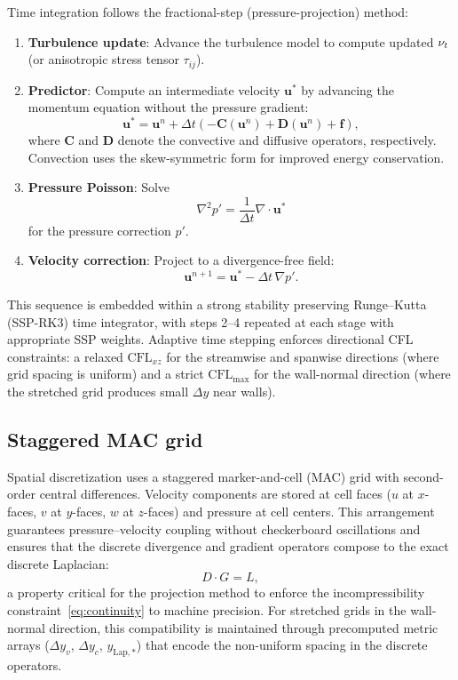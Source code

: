 Time integration follows the fractional-step (pressure-projection) method:
\begin{enumerate}
    \item \textbf{Turbulence update}: Advance the turbulence model to compute updated $\nu_t$ (or anisotropic stress tensor $\tau_{ij}$).
    \item \textbf{Predictor}: Compute an intermediate velocity $\bm{u}^*$ by advancing the momentum equation without the pressure gradient:
    \begin{equation}
        \bm{u}^* = \bm{u}^n + \Delta t \left( -\bm{C}(\bm{u}^n) + \bm{D}(\bm{u}^n) + \bm{f} \right),
    \end{equation}
    where $\bm{C}$ and $\bm{D}$ denote the convective and diffusive operators, respectively.
    Convection uses the skew-symmetric form for improved energy conservation.
    \item \textbf{Pressure Poisson}: Solve
    \begin{equation}
        \nabla^2 p' = \frac{1}{\Delta t} \nabla \cdot \bm{u}^*
    \end{equation}
    for the pressure correction $p'$.
    \item \textbf{Velocity correction}: Project to a divergence-free field:
    \begin{equation}
        \bm{u}^{n+1} = \bm{u}^* - \Delta t \, \nabla p'.
    \end{equation}
\end{enumerate}
This sequence is embedded within a strong stability preserving Runge--Kutta (SSP-RK3) time integrator, with steps 2--4 repeated at each stage with appropriate SSP weights.
Adaptive time stepping enforces directional CFL constraints: a relaxed $\mathrm{CFL}_{xz}$ for the streamwise and spanwise directions (where grid spacing is uniform) and a strict $\mathrm{CFL}_{\max}$ for the wall-normal direction (where the stretched grid produces small $\Delta y$ near walls).

\subsection{Staggered MAC grid}

Spatial discretization uses a staggered marker-and-cell (MAC) grid with second-order central differences.
Velocity components are stored at cell faces ($u$ at $x$-faces, $v$ at $y$-faces, $w$ at $z$-faces) and pressure at cell centers.
This arrangement guarantees pressure--velocity coupling without checkerboard oscillations and ensures that the discrete divergence and gradient operators compose to the exact discrete Laplacian:
\begin{equation}
    D \cdot G = L,
\end{equation}
a property critical for the projection method to enforce the incompressibility constraint~\eqref{eq:continuity} to machine precision.
For stretched grids in the wall-normal direction, this compatibility is maintained through precomputed metric arrays ($\Delta y_v$, $\Delta y_c$, $y_{\mathrm{Lap},*}$) that encode the non-uniform spacing in the discrete operators.

